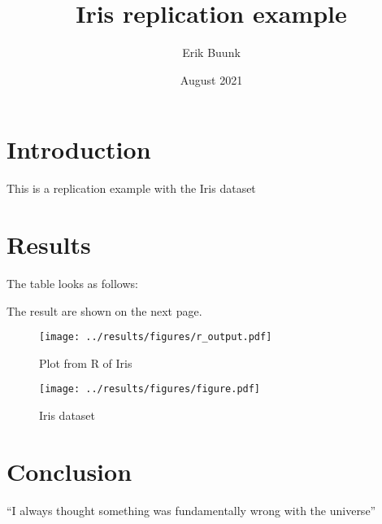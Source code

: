 \documentclass{article}
\title{Iris replication example}
\author{Erik Buunk}
\date{August 2021}
\begin{document}
\maketitle

\section{Introduction}
This is a replication example with the Iris dataset

\section{Results}
The table looks as follows:



The result are shown on the next page.

\begin{figure}
    \centering
    \texttt{[image: ../results/figures/r\_output.pdf]}
    \caption{Plot from R of Iris}
    \label{fig:iris_r}
\end{figure}


\begin{figure}
\centering
\texttt{[image: ../results/figures/figure.pdf]}
\caption{Iris dataset}
\label{fig:iris}
\end{figure}

\section{Conclusion}
``I always thought something was fundamentally wrong with the universe'' \citep{adams1995hitchhiker}



\end{document}
